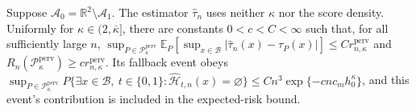 Suppose \(\mathcal A_0=\mathbb R^2\setminus\mathcal A_1\). The estimator \(\widehat\tau_n\) uses neither \(\kappa\) nor the score density. Uniformly for \(\kappa\in(2,\overline\kappa]\), there are constants \(0<c<C<\infty\) such that, for all sufficiently large \(n\), \(\sup_{P\in\mathcal P_{\kappa}^{\mathrm{perv}}}\mathbb E_P[\sup_{x\in\mathcal B}|\widehat\tau_n(x)-\tau_P(x)|]\le C r_{n,\kappa}^{\mathrm{perv}}\) and \(R_n(\mathcal P_{\kappa}^{\mathrm{perv}})\ge c r_{n,\kappa}^{\mathrm{perv}}\). Its fallback event obeys \(\sup_{P\in\mathcal P_{\kappa}^{\mathrm{perv}}}P\{\exists x\in\mathcal B,\ t\in\{0,1\}:\widehat{\mathcal H}_{t,n}(x)=\varnothing\}\le Cn^3\exp\{-c n c_m h_0^{\kappa}\}\), and this event's contribution is included in the expected-risk bound.